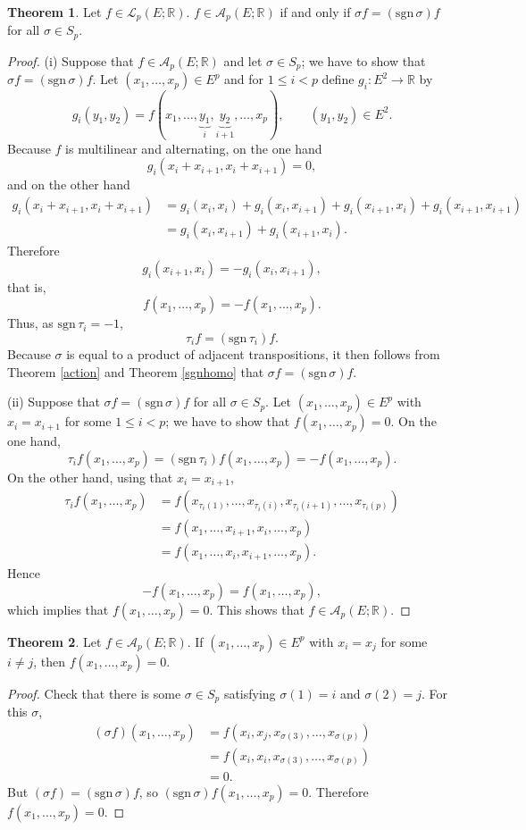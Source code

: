 \documentclass{article}
\newcommand{\sgn}{\mathrm{sgn}\,}
\theoremstyle{definition}
\newtheorem{theorem}{Theorem}
\theoremstyle{definition}
\begin{document}
\begin{theorem}
Let $f \in \mathscr{L}_p(E;\mathbb{R})$. $f \in \mathscr{A}_p(E;\mathbb{R})$ if and only if $\sigma f = (\sgn \sigma) f$ for all
$\sigma \in S_p$.
\label{sgnalternating}
\end{theorem}
\begin{proof}
(i) Suppose that $f \in \mathscr{A}_p(E;\mathbb{R})$ and let $\sigma \in S_p$; we have to show that $\sigma f = (\sgn \sigma) f$. 
Let $(x_1,\ldots,x_p) \in E^p$ and for $1 \leq i < p$ define $g_i:E^2 \to \mathbb{R}$ by
\[
g_i(y_1,y_2) = f(x_1,\ldots,\underbrace{y_1}_i,\underbrace{y_2}_{i+1},\ldots,x_p),
\qquad (y_1,y_2) \in E^2.
\]
Because $f$ is multilinear and alternating, on the one hand
\[
g_i(x_i+x_{i+1},x_i+x_{i+1}) = 0,
\]
and on the other hand
\begin{align*}
g_i(x_i+x_{i+1},x_i+x_{i+1})&=g_i(x_i,x_i)+g_i(x_i,x_{i+1})+
g_i(x_{i+1},x_i)+g_i(x_{i+1},x_{i+1})\\
&=g_i(x_i,x_{i+1})+
g_i(x_{i+1},x_i).
\end{align*} 
Therefore
\[
g_i(x_{i+1},x_i) = -g_i(x_i,x_{i+1}),
\]
that is,
\[
f(x_1,\ldots,x_p) = -f(x_1,\ldots,x_p).
\]
Thus, as $\sgn \tau_i=-1$,
\[
\tau_i f = (\sgn \tau_i) f.
\]
Because $\sigma$ is equal to a product of adjacent transpositions, it then follows from Theorem \ref{action} and
Theorem \ref{sgnhomo} that 
$\sigma f = (\sgn \sigma) f$. 

(ii) Suppose that $\sigma f = (\sgn \sigma) f$ for all $\sigma \in S_p$. 
Let $(x_1,\ldots,x_p) \in E^p$ with $x_i=x_{i+1}$ for some $1 \leq i < p$; we have
to show that $f(x_1,\ldots,x_p)=0$.
On the one hand,
\[
\tau_i f(x_1,\ldots,x_p) = (\sgn \tau_i) f(x_1,\ldots,x_p) = -f(x_1,\ldots,x_p).
\]
On the other hand, using that $x_i=x_{i+1}$,
\begin{align*}
\tau_i f(x_1,\ldots,x_p) &= f(x_{\tau_i(1)},\ldots,x_{\tau_i(i)},
x_{\tau_i(i+1)},\ldots,x_{\tau_i(p)})\\
&=f(x_1,\ldots,x_{i+1},x_i,\ldots,x_p)\\
&=f(x_1,\ldots,x_i,x_{i+1},\ldots,x_p).
\end{align*}
Hence
\[
-f(x_1,\ldots,x_p) = f(x_1,\ldots,x_p),
\]
which implies that $f(x_1,\ldots,x_p)=0$. This shows that $f \in \mathscr{A}_p(E;\mathbb{R})$.
\end{proof}

\begin{theorem}
Let $f \in \mathscr{A}_p(E;\mathbb{R})$. If
$(x_1,\ldots,x_p) \in E^p$ with $x_i=x_j$ for some $i \neq j$, then
$f(x_1,\ldots,x_p) = 0$.
\label{transposition}
\end{theorem}
\begin{proof}
Check that there is some $\sigma \in S_p$ satisfying $\sigma(1)=i$ and $\sigma(2)=j$.
For this $\sigma$,
\begin{align*}
(\sigma f)(x_1,\ldots,x_p) &=f(x_i,x_j,x_{\sigma(3)},\ldots,x_{\sigma(p)})\\
&=f(x_i,x_i,x_{\sigma(3)},\ldots,x_{\sigma(p)})\\
&=0.
\end{align*}
But $(\sigma f) = (\sgn \sigma) f$, so $(\sgn \sigma) f(x_1,\ldots,x_p) = 0$. Therefore
$f(x_1,\ldots,x_p)=0$.
\end{proof}
\end{document}
